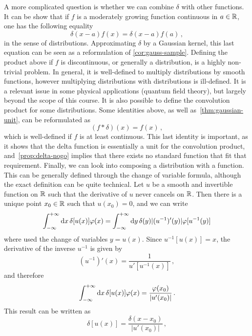 A more complicated question is whether we can combine $\delta$ with other functions. It
can be show that if $f$ is a moderately growing function continuous in $a\in\mathbb{R}$, one has
the following equality
\begin{equation}
	\label{eq:delta-times-f}
	\delta(x-a)f(x)=\delta(x-a)f(a)\,,
\end{equation}
in the sense of distributions. Approximating $\delta$ by a Gaussian kernel, this last
equation can be seen as a reformulation of \cref{cor:gauss-sample}. Defining the product
above if $f$ is discontinuous, or generally a distribution, is a highly non-trivial
problem. In general, it is well-defined to multiply distributions by smooth functions,
however multiplying distributions with distributions is ill-defined. It is a relevant
issue in some physical applications (\eg quantum field theory), but largely beyond the
scope of this course. It is also possible to define the convolution product for some
distributions. Some identities above, as well as~\cref{thm:gaussian-unit}, can be
reformulated as
\begin{equation}
	(f\ast\delta)(x)=f(x)\,,
\end{equation}
which is well-defined if $f$ is at least continuous. This last identity is important, as
it shows that the delta function is essentially a unit for the convolution product,
and~\cref{prop:delta-nogo} implies that there exists no standard function that fit that
requirement. Finally, we can look into composing a distribution with a function. This can
be generally defined through the change of variable formula, although the exact definition
can be quite technical. Let $u$ be a smooth and invertible function on $\mathbb{R}$ such that the
derivative of $u$ never cancels on $\mathbb{R}$. Then there is a unique point $x_0\in\mathbb{R}$ such that
$u(x_0)=0$, and we can write
\begin{equation}
	\int_{-\infty}^{+\infty}\mathrm{d}{x}\,\delta[u(x)]\varphi(x)=\int_{-\infty}^{+\infty}\mathrm{d}{y}\,\delta(y)|(u^{-1})'(y)|\varphi[u^{-1}(y)]
\end{equation}
where used the change of variables $y=u(x)$. Since $u^{-1}[u(x)]=x$, the derivative of the
inverse $u^{-1}$ is given by
\begin{equation}
	(u^{-1})'(x)=\frac{1}{u'[u^{-1}(x)]}\,,
\end{equation}
and therefore
\begin{equation}
	\int_{-\infty}^{+\infty}\mathrm{d}{x}\,\delta[u(x)]\varphi(x)=\frac{\varphi(x_0)}{|u'(x_0)|}\,.
\end{equation}
This result can be written as
\begin{equation}
	\delta[u(x)]=\frac{\delta(x-x_0)}{|u'(x_0)|}\,,
\end{equation}
